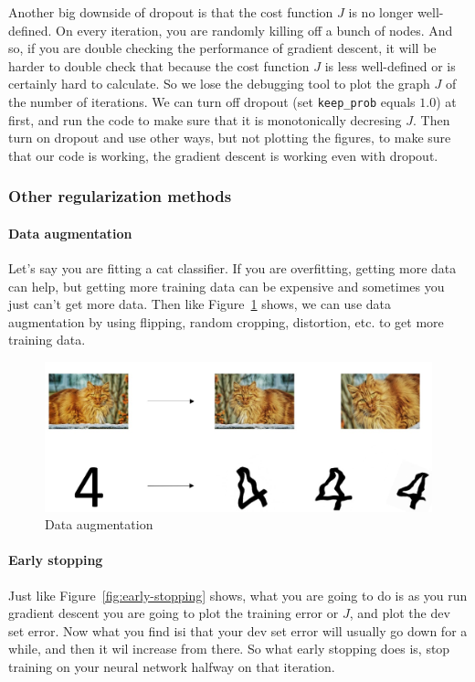 \documentclass[UTF8]{article}
\begin{document}
Another big downside of dropout is that the cost function $J$ is no longer well-defined. On every
iteration, you are randomly killing off a bunch of nodes. And so, if you are double checking the
performance of gradient descent, it will be harder to double check that because the cost function
$J$ is less well-defined or is certainly hard to calculate. So we lose the debugging tool to plot
the graph $J$ of the number of iterations. We can turn off dropout (set \texttt{keep\_prob} equals
$1.0$) at first, and run the code to make sure that it is monotonically decresing $J$. Then turn on
dropout and use other ways, but not plotting the figures, to make sure that our code is working,
the gradient descent is working even with dropout.

\subsubsection{Other regularization methods}
\paragraph{Data augmentation}
Let's say you are fitting a cat classifier. If you are overfitting, getting more data can help, but
getting more training data can be expensive and sometimes you just can't get more data. Then like
Figure~\ref{fig:data-augmentation} shows, we can use data augmentation by using flipping, random
cropping, distortion, etc. to get more training data.

\begin{figure}[htb]
    \centering
    \includegraphics[width=40em]{figures/data-augmentation}
    \caption{Data augmentation}
    \label{fig:data-augmentation}
\end{figure}

\paragraph{Early stopping}
Just like Figure~\ref{fig:early-stopping} shows, what you are going to do is as you run gradient
descent you are going to plot the training error or $J$, and plot the dev set error. Now what you
find isi that your dev set error will usually go down for a while, and then it wil increase from
there. So what early stopping does is, stop training on your neural network halfway on that
iteration.
\end{document}
